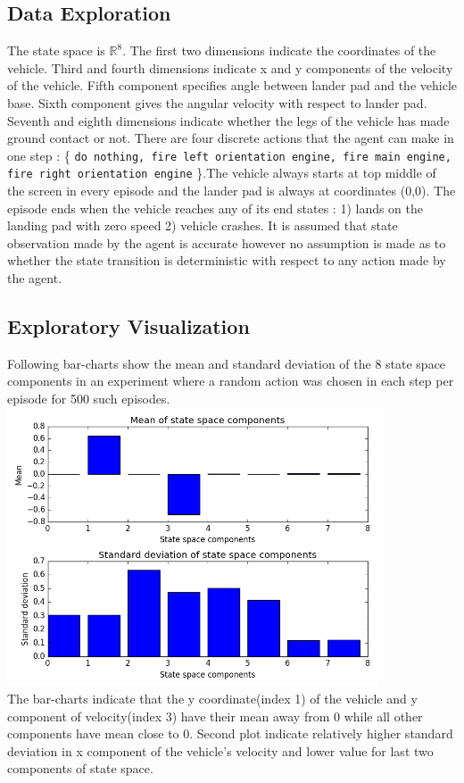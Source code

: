 \documentclass{svproc}
\begin{document}
\subsection*{Data Exploration}
The state space is $\mathbb{R}^8$. The first two dimensions indicate the coordinates of the vehicle. Third and fourth dimensions indicate x and y components of the velocity of the vehicle. Fifth component specifies angle between lander pad and the vehicle base. Sixth component gives the angular velocity with respect to lander pad. Seventh and eighth dimensions indicate whether the legs of the vehicle has made ground contact or not. There are four discrete actions that the agent can make in one step : \{ \texttt{do nothing, fire left orientation engine, fire main engine, fire right orientation engine} \}.The vehicle always starts at top middle of the screen in every episode and the lander pad is always at coordinates (0,0). The episode ends when the vehicle reaches any of its end states : 1) lands on the landing pad with zero speed 2) vehicle crashes. It is assumed that state observation made by the agent is accurate however no assumption is made as to whether the state transition is deterministic with respect to any action made by the agent.
\subsection*{Exploratory Visualization}
Following bar-charts show the mean and standard deviation of the 8 state space components in an experiment where a random action was chosen in each step per episode for 500 such episodes.\\
\includegraphics[width=11cm]{img/state-space}\\
The bar-charts indicate that the y coordinate(index 1) of the vehicle and y component of velocity(index 3) have their mean away from 0 while all other components have mean close to 0. Second plot indicate relatively higher standard deviation in x component of the vehicle's velocity and lower value for last two components of state space.
\end{document}
